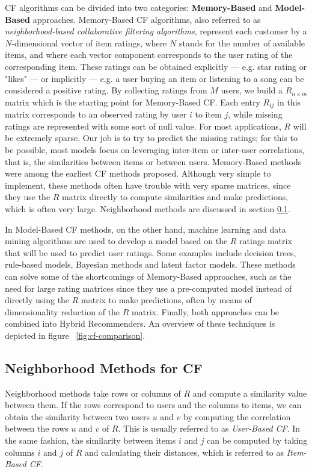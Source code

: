 \documentclass[cic,tc,english]{iiufrgs}
\begin{document}
CF algorithms can be divided into two categories: \textbf{Memory-Based} and \textbf{Model-Based} approaches. Memory-Based CF algorithms, also referred to as \textit{neighborhood-based collaborative filtering algorithms}, represent each customer by a \(N\)-dimensional vector of item ratings, where \(N\) stands for the number of available items, and where each vector component corresponds to the user rating of the corresponding item. These ratings can be obtained explicitly --- e.g. star rating or "likes" --- or implicitly --- e.g. a user buying an item or listening to a song can be considered a positive rating. By collecting ratings from $M$ users, we build a \(R_{n \times m}\) matrix which is the starting point for Memory-Based CF. Each entry $R_{ij}$ in this matrix corresponds to an observed rating by user $i$ to item $j$, while missing ratings are represented with some sort of null value. For most applications, $R$ will be extremely sparse. Our job is to try to predict the missing ratings; for this to be possible, most models focus on leveraging inter-item or inter-user correlations, that is, the similarities between items or between users. Memory-Based methods were among the earliest CF methods proposed. Although very simple to implement, these methods often have trouble with very sparse matrices, since they use the $R$ matrix directly to compute similarities and make predictions, which is often very large. Neighborhood methods are discussed in section \ref{neighbourhood}.

In Model-Based CF methods, on the other hand, machine learning and data mining algorithms are used to develop a model based on the $R$ ratings matrix that will be used to predict user ratings. Some examples include decision trees, rule-based models, Bayesian methods and latent factor models. These methods can solve some of the shortcomings of Memory-Based approaches, such as the need for large rating matrices since they use a pre-computed model instead of directly using the $R$ matrix to make predictions, often by means of dimensionality reduction of the $R$ matrix. Finally, both approaches can be combined into Hybrid Recommenders. An overview of these techniques is depicted in figure ~\ref{fig:cf-comparison}.

\subsection{Neighborhood Methods for CF} 
\label{neighbourhood}
    Neighborhood methods take rows or columns of $R$ and compute a similarity value between them. If the rows correspond to users and the columns to items, we can obtain the similarity between two users $u$ and $v$ by computing the correlation between the rows $u$ and $v$ of $R$. This is usually referred to as \textit{User-Based CF}. In the same fashion, the similarity between items $i$ and $j$ can be computed by taking columns $i$ and $j$ of $R$ and calculating their distances, which is referred to as \textit{Item-Based CF}.
\end{document}
